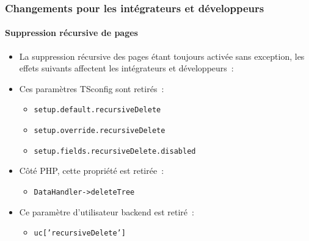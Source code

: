 %

\begin{frame}[fragile]
	\frametitle{Changements pour les intégrateurs et développeurs}
	\framesubtitle{Suppression récursive de pages}

	\lstset{basicstyle=\tiny\ttfamily}

	\begin{itemize}
		\item La suppression récursive des pages étant toujours activée sans exception,
			les effets suivants affectent les intégrateurs et développeurs~:
		\item Ces paramètres TSconfig sont retirés~:

			\begin{itemize}
				\item \texttt{setup.default.recursiveDelete}
				\item \texttt{setup.override.recursiveDelete}
				\item \texttt{setup.fields.recursiveDelete.disabled}
			\end{itemize}

		\item Côté PHP, cette propriété est retirée~:

			\begin{itemize}
				\item \texttt{DataHandler->deleteTree}
			\end{itemize}

		\item Ce paramètre d'utilisateur backend est retiré~:

			\begin{itemize}
				\item \texttt{uc['recursiveDelete']}
			\end{itemize}

	\end{itemize}

\end{frame}

